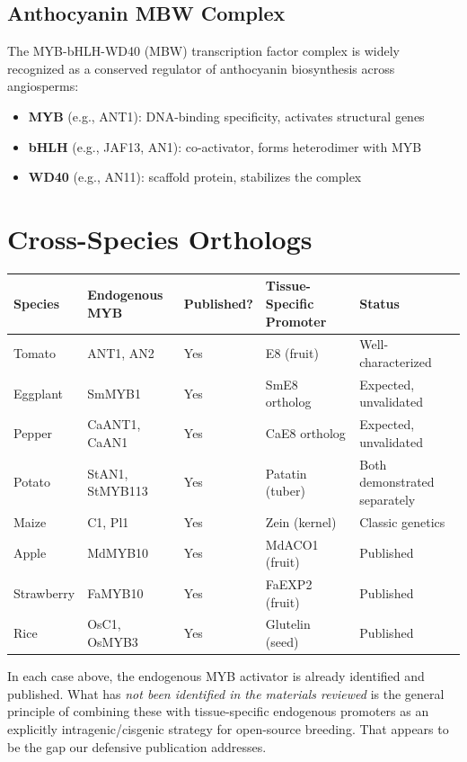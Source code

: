\documentclass[12pt,a4paper]{article}
\begin{document}
\subsection{Anthocyanin MBW Complex}

The MYB-bHLH-WD40 (MBW) transcription factor complex is widely recognized as a conserved regulator of anthocyanin biosynthesis across angiosperms:
\begin{itemize}
  \item \textbf{MYB} (e.g., ANT1): DNA-binding specificity, activates structural genes
  \item \textbf{bHLH} (e.g., JAF13, AN1): co-activator, forms heterodimer with MYB
  \item \textbf{WD40} (e.g., AN11): scaffold protein, stabilizes the complex
\end{itemize}

\section{Cross-Species Orthologs}

\begin{longtable}{p{2.5cm} p{3cm} p{1.5cm} p{3cm} p{3cm}}
\toprule
\textbf{Species} & \textbf{Endogenous MYB} & \textbf{Published?} & \textbf{Tissue-Specific Promoter} & \textbf{Status} \\
\midrule
\endhead
Tomato & ANT1, AN2 & Yes & E8 (fruit) & Well-characterized \\
Eggplant & SmMYB1 & Yes & SmE8 ortholog & Expected, unvalidated \\
Pepper & CaANT1, CaAN1 & Yes & CaE8 ortholog & Expected, unvalidated \\
Potato & StAN1, StMYB113 & Yes & Patatin (tuber) & Both demonstrated separately \\
Maize & C1, Pl1 & Yes & Zein (kernel) & Classic genetics \\
Apple & MdMYB10 & Yes & MdACO1 (fruit) & Published \\
Strawberry & FaMYB10 & Yes & FaEXP2 (fruit) & Published \\
Rice & OsC1, OsMYB3 & Yes & Glutelin (seed) & Published \\
\bottomrule
\end{longtable}

\noindent In each case above, the endogenous MYB activator is already identified and published. What has \textit{not been identified in the materials reviewed} is the general principle of combining these with tissue-specific endogenous promoters as an explicitly intragenic/cisgenic strategy for open-source breeding. That appears to be the gap our defensive publication addresses.
\end{document}
